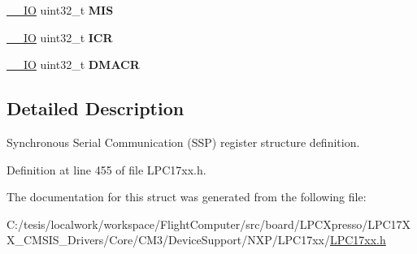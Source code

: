 \begin{DoxyCompactItemize}
\item 
\hypertarget{struct_l_p_c___s_s_p___type_def_a47daa783e72e341ffa762b8f89d32a74}{\hyperlink{group___c_m_s_i_s__core__definitions_gaec43007d9998a0a0e01faede4133d6be}{\-\_\-\-\_\-\-I\-O} uint32\-\_\-t {\bfseries \-M\-I\-S}}\label{struct_l_p_c___s_s_p___type_def_a47daa783e72e341ffa762b8f89d32a74}

\item 
\hypertarget{struct_l_p_c___s_s_p___type_def_afd52865baab6eb928d86d2f79293df2d}{\hyperlink{group___c_m_s_i_s__core__definitions_gaec43007d9998a0a0e01faede4133d6be}{\-\_\-\-\_\-\-I\-O} uint32\-\_\-t {\bfseries \-I\-C\-R}}\label{struct_l_p_c___s_s_p___type_def_afd52865baab6eb928d86d2f79293df2d}

\item 
\hypertarget{struct_l_p_c___s_s_p___type_def_a94233394a593bf8de9a8497bf37cbc3c}{\hyperlink{group___c_m_s_i_s__core__definitions_gaec43007d9998a0a0e01faede4133d6be}{\-\_\-\-\_\-\-I\-O} uint32\-\_\-t {\bfseries \-D\-M\-A\-C\-R}}\label{struct_l_p_c___s_s_p___type_def_a94233394a593bf8de9a8497bf37cbc3c}

\end{DoxyCompactItemize}


\subsection{\-Detailed \-Description}
\-Synchronous \-Serial \-Communication (\-S\-S\-P) register structure definition. 

\-Definition at line 455 of file \-L\-P\-C17xx.\-h.



\-The documentation for this struct was generated from the following file\-:\begin{DoxyCompactItemize}
\item 
\-C\-:/tesis/localwork/workspace/\-Flight\-Computer/src/board/\-L\-P\-C\-Xpresso/\-L\-P\-C17\-X\-X\-\_\-\-C\-M\-S\-I\-S\-\_\-\-Drivers/\-Core/\-C\-M3/\-Device\-Support/\-N\-X\-P/\-L\-P\-C17xx/\hyperlink{_l_p_c17xx_8h}{\-L\-P\-C17xx.\-h}\end{DoxyCompactItemize}
